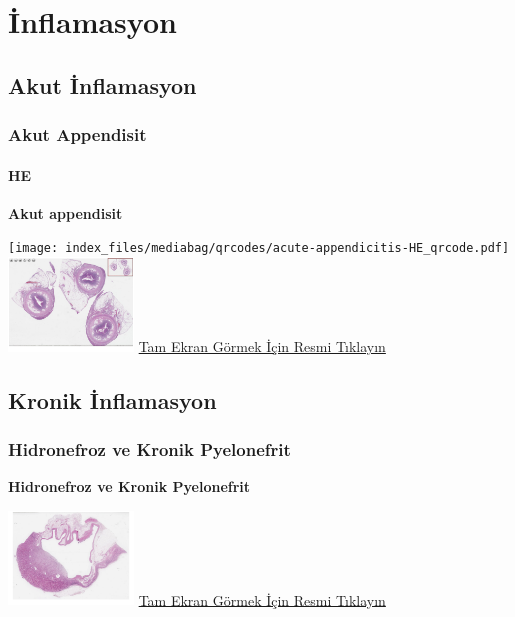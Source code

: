 \documentclass[
  letterpaper,
  DIV=11,
  numbers=noendperiod]{scrreprt}
\begin{document}
\part{İnflamasyon}

\hypertarget{sec-akut-inflamasyon}{%
\chapter{Akut İnflamasyon}\label{sec-akut-inflamasyon}}

\hypertarget{sec-akut-appendisit}{%
\section{Akut Appendisit}\label{sec-akut-appendisit}}

\hypertarget{he-3}{%
\subsection{HE}\label{he-3}}

\textbf{Akut appendisit}

\texttt{[image: index\_files/mediabag/qrcodes/acute-appendicitis-HE\_qrcode.pdf]}
\href{https://images.patolojiatlasi.com/acute-appendicitis/HE.html}{\includegraphics[width=0.25\textwidth,height=\textheight]{./screenshots/thumbnail_acute-appendicitis.png}}
\href{https://images.patolojiatlasi.com/acute-appendicitis/HE.html}{Tam
Ekran Görmek İçin Resmi Tıklayın}

\hypertarget{sec-kronik-inflamasyon}{%
\chapter{Kronik İnflamasyon}\label{sec-kronik-inflamasyon}}

\hypertarget{sec-hidronefroz-kronik-pyelonefrit}{%
\section{Hidronefroz ve Kronik
Pyelonefrit}\label{sec-hidronefroz-kronik-pyelonefrit}}

\textbf{Hidronefroz ve Kronik Pyelonefrit}

\href{https://images.patolojiatlasi.com/chronicpyelonephritis/HE1.html}{\includegraphics[width=0.25\textwidth,height=\textheight]{./screenshots/thumbnail_chronicpyelonephritis-1.png}}
\href{https://images.patolojiatlasi.com/chronicpyelonephritis/HE1.html}{Tam
Ekran Görmek İçin Resmi Tıklayın}
\end{document}
